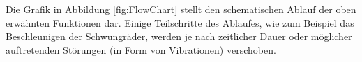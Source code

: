 \noindent Die Grafik in Abbildung \ref{fig:FlowChart} stellt den schematischen Ablauf der oben erwähnten Funktionen dar. 
Einige Teilschritte des Ablaufes, wie zum Beispiel das Beschleunigen der Schwungräder, werden 
je nach zeitlicher Dauer oder möglicher auftretenden Störungen (in Form von Vibrationen) verschoben.